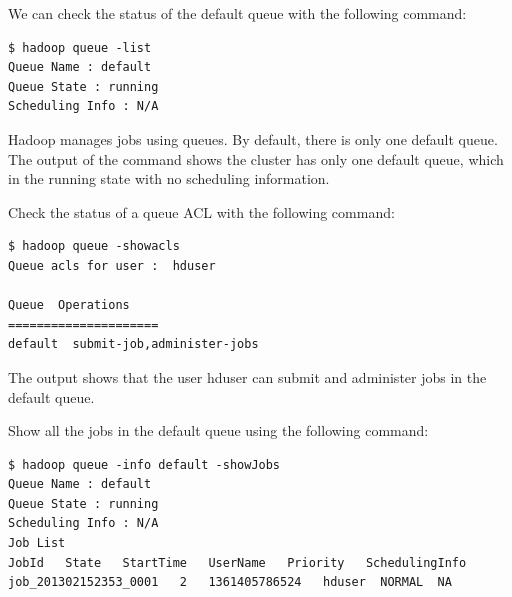 We can check the status of the default queue with the following command:
\begin{verbatim}
$ hadoop queue -list
Queue Name : default
Queue State : running
Scheduling Info : N/A
\end{verbatim}

Hadoop manages jobs using queues. By default, there is only one default queue. The output of the command shows the cluster has only one default queue, which in the running state with no scheduling information.

Check the status of a queue ACL with the following command: 
\begin{verbatim}
$ hadoop queue -showacls
Queue acls for user :  hduser

Queue  Operations
=====================
default  submit-job,administer-jobs
\end{verbatim}

The output shows that the user hduser can submit and administer jobs in the default queue.

Show all the jobs in the default queue using the following command:
\begin{verbatim}
$ hadoop queue -info default -showJobs
Queue Name : default
Queue State : running
Scheduling Info : N/A
Job List
JobId   State   StartTime   UserName   Priority   SchedulingInfo
job_201302152353_0001   2   1361405786524   hduser  NORMAL  NA
\end{verbatim}


